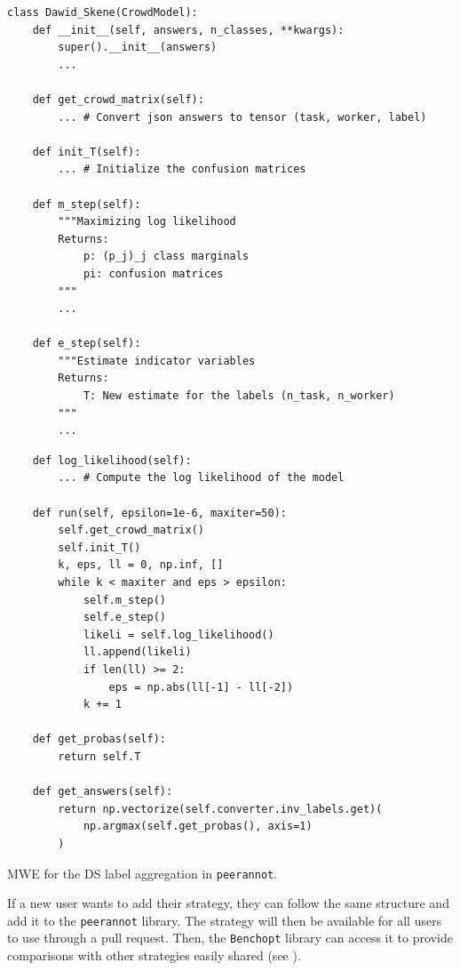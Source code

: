 \begin{listing}[H]
    \begin{verbatim}
class Dawid_Skene(CrowdModel):
    def __init__(self, answers, n_classes, **kwargs):
        super().__init__(answers)
        ...

    def get_crowd_matrix(self):
        ... # Convert json answers to tensor (task, worker, label)

    def init_T(self):
        ... # Initialize the confusion matrices

    def m_step(self):
        """Maximizing log likelihood
        Returns:
            p: (p_j)_j class marginals
            pi: confusion matrices
        """
        ...

    def e_step(self):
        """Estimate indicator variables
        Returns:
            T: New estimate for the labels (n_task, n_worker)
        """
        ...

\end{verbatim}
\end{listing}
\begin{listing}[H]
    \begin{verbatim}
    def log_likelihood(self):
        ... # Compute the log likelihood of the model

    def run(self, epsilon=1e-6, maxiter=50):
        self.get_crowd_matrix()
        self.init_T()
        k, eps, ll = 0, np.inf, []
        while k < maxiter and eps > epsilon:
            self.m_step()
            self.e_step()
            likeli = self.log_likelihood()
            ll.append(likeli)
            if len(ll) >= 2:
                eps = np.abs(ll[-1] - ll[-2])
            k += 1

    def get_probas(self):
        return self.T

    def get_answers(self):
        return np.vectorize(self.converter.inv_labels.get)(
            np.argmax(self.get_probas(), axis=1)
        )
\end{verbatim}
\caption{MWE for the DS label aggregation in \texttt{peerannot}.}
\label{listing:DS}
\end{listing}

If a new user wants to add their strategy, they can follow the same structure and add it to the \texttt{peerannot} library. The strategy will then be available for all users to use through a pull request.
Then, the \texttt{Benchopt} library can access it to provide comparisons with other strategies easily shared (see ).


